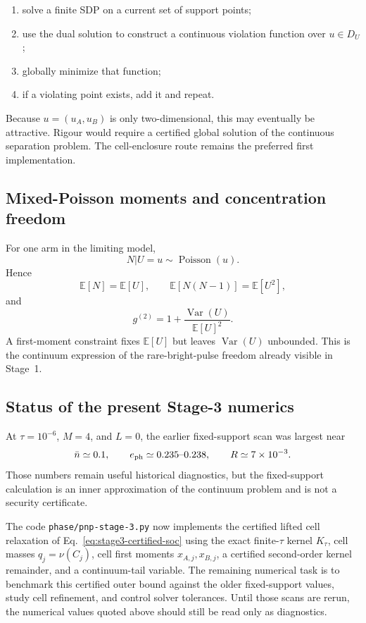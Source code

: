 \documentclass[11pt]{article}
\theoremstyle{remark}
\begin{document}
\begin{enumerate}
    \item solve a finite SDP on a current set of support points;
    \item use the dual solution to construct a continuous violation function
    over \(u\in D_U\);
    \item globally minimize that function;
    \item if a violating point exists, add it and repeat.
\end{enumerate}

Because \(u=(u_A,u_B)\) is only two-dimensional, this may eventually be
attractive.  Rigour would require a certified global solution of the
continuous separation problem.  The cell-enclosure route remains the
preferred first implementation.

\subsection{Mixed-Poisson moments and concentration freedom}

For one arm in the limiting model,
\[
    N|U=u\sim\operatorname{Poisson}(u).
\]
Hence
\[
    \mathbb E[N]
    =
    \mathbb E[U],
    \qquad
    \mathbb E[N(N-1)]
    =
    \mathbb E[U^2],
\]
and
\begin{equation}
    g^{(2)}
    =
    1+
    \frac{\operatorname{Var}(U)}
         {\mathbb E[U]^2}.
    \label{eq:stage3-mixed-poisson-g2}
\end{equation}
A first-moment constraint fixes \(\mathbb E[U]\) but leaves
\(\operatorname{Var}(U)\) unbounded.  This is the continuum expression of the
rare-bright-pulse freedom already visible in Stage~1.

\subsection{Status of the present Stage-3 numerics}

At \(\tau=10^{-6}\), \(M=4\), and \(L=0\), the earlier fixed-support scan was
largest near
\[
    \bar n\simeq0.1,
    \qquad
    e_{\rm ph}\simeq0.235\text{--}0.238,
    \qquad
    R\simeq7\times10^{-3}.
\]
Those numbers remain useful historical diagnostics, but the fixed-support
calculation is an inner approximation of the continuum problem and is not a
security certificate.

The code \texttt{phase/pnp-stage-3.py} now implements the certified lifted
cell relaxation of Eq.~\eqref{eq:stage3-certified-soc} using the exact
finite-\(\tau\) kernel \(K_\tau\), cell masses
\(q_j=\nu(C_j)\), cell first moments \(x_{A,j},x_{B,j}\), a certified
second-order kernel remainder, and a continuum-tail variable.
The remaining numerical task is to benchmark this certified outer bound
against the older fixed-support values, study cell refinement, and control
solver tolerances.  Until those scans are rerun, the numerical values quoted
above should still be read only as diagnostics.
\end{document}
